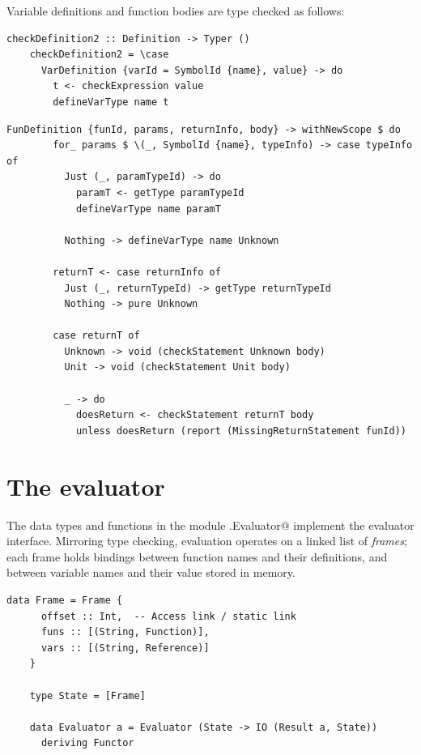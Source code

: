 \documentclass[UdineBachThesis,american,11pt]{PhdThesis}
\begin{document}
  Variable definitions and function bodies are type checked as follows:

  \begin{lstlisting}[gobble=4,basicstyle=\ttfamily\small]
    checkDefinition2 :: Definition -> Typer ()
    checkDefinition2 = \case
      VarDefinition {varId = SymbolId {name}, value} -> do
        t <- checkExpression value
        defineVarType name t
  \end{lstlisting}

  \newpage

  \begin{lstlisting}[gobble=4,basicstyle=\ttfamily\small]
      FunDefinition {funId, params, returnInfo, body} -> withNewScope $ do
        for_ params $ \(_, SymbolId {name}, typeInfo) -> case typeInfo of
          Just (_, paramTypeId) -> do
            paramT <- getType paramTypeId
            defineVarType name paramT

          Nothing -> defineVarType name Unknown

        returnT <- case returnInfo of
          Just (_, returnTypeId) -> getType returnTypeId
          Nothing -> pure Unknown

        case returnT of
          Unknown -> void (checkStatement Unknown body)
          Unit -> void (checkStatement Unit body)

          _ -> do
            doesReturn <- checkStatement returnT body
            unless doesReturn (report (MissingReturnStatement funId))
  \end{lstlisting}

  \section{The evaluator}

  The data types and functions in the module \lstinline@Devin.Evaluator@
  implement the evaluator interface. Mirroring type checking, evaluation
  operates on a linked list of \emph{frames}; each frame holds bindings between
  function names and their definitions, and between variable names and their
  value stored in memory.

  \begin{lstlisting}[gobble=4,basicstyle=\ttfamily\small]
    data Frame = Frame {
      offset :: Int,  -- Access link / static link
      funs :: [(String, Function)],
      vars :: [(String, Reference)]
    }

    type State = [Frame]

    data Evaluator a = Evaluator (State -> IO (Result a, State))
      deriving Functor
  \end{lstlisting}
\end{document}
